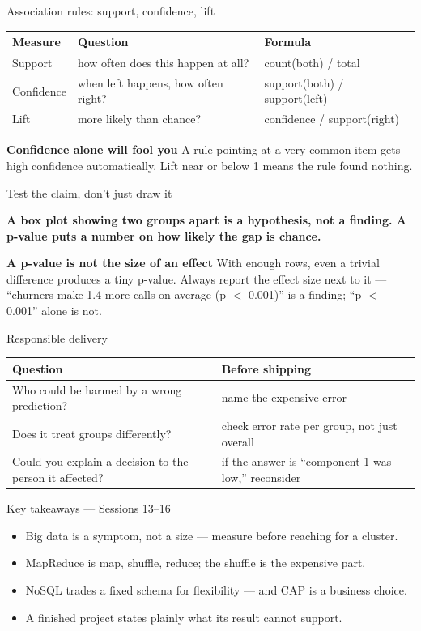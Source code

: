 \documentclass[10pt,aspectratio=169]{beamer}
\newcommand{\keyidea}[1]{%
  \begin{block}{}
  \centering\Large\bfseries\color{dsblue} #1
  \end{block}%
}
\newcommand{\trapbox}[2]{%
  \begin{alertblock}{\textbf{#1}}
  #2
  \end{alertblock}%
}
\begin{document}
\begin{frame}{Association rules: support, confidence, lift}
\begin{table}
\small
\begin{tabularx}{\linewidth}{@{}lXl@{}}
\toprule
\textbf{Measure} & \textbf{Question} & \textbf{Formula} \\
\midrule
Support & how often does this happen at all? & count(both) / total \\
Confidence & when left happens, how often right? & support(both) / support(left) \\
Lift & more likely than chance? & confidence / support(right) \\
\bottomrule
\end{tabularx}
\end{table}
\trapbox{Confidence alone will fool you}{A rule pointing at a very common item gets high confidence automatically. Lift near or below 1 means the rule found nothing.}
\end{frame}

\begin{frame}{Test the claim, don't just draw it}
\keyidea{A box plot showing two groups apart is a hypothesis, not a finding. A p-value puts a number on how likely the gap is chance.}
\trapbox{A p-value is not the size of an effect}{With enough rows, even a trivial difference produces a tiny p-value. Always report the effect size next to it --- ``churners make 1.4 more calls on average (p $<$ 0.001)'' is a finding; ``p $<$ 0.001'' alone is not.}
\end{frame}

\begin{frame}{Responsible delivery}
\begin{table}
\footnotesize
\begin{tabularx}{\linewidth}{@{}lX@{}}
\toprule
\textbf{Question} & \textbf{Before shipping} \\
\midrule
Who could be harmed by a wrong prediction? & name the expensive error \\
Does it treat groups differently? & check error rate per group, not just overall \\
Could you explain a decision to the person it affected? & if the answer is ``component 1 was low,'' reconsider \\
\bottomrule
\end{tabularx}
\end{table}
\end{frame}

\begin{frame}{Key takeaways --- Sessions 13--16}
\begin{itemize}
\item Big data is a symptom, not a size --- measure before reaching for a cluster.
\item MapReduce is map, shuffle, reduce; the shuffle is the expensive part.
\item NoSQL trades a fixed schema for flexibility --- and CAP is a business choice.
\item A finished project states plainly what its result cannot support.
\end{itemize}
\end{frame}
\end{document}
